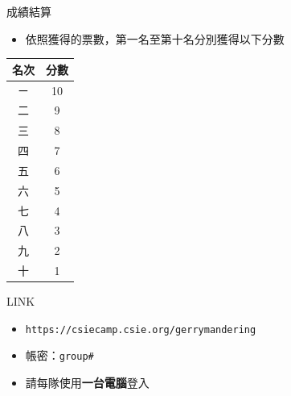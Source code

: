 \begin{frame}{成績結算}
  \vspace{0.4em}
  \begin{itemize}
    \item 依照獲得的票數，第一名至第十名分別獲得以下分數
  \end{itemize}

    \begin{table}[hc]
\centering
\begin{tabular}{|c|c|}
\hline
    \textbf{名次} & \textbf{分數} \\ \hline
    ㄧ & 10 \\ \hline
    二 & 9 \\ \hline
    三 & 8 \\ \hline
    四 & 7 \\ \hline
    五 & 6 \\ \hline
    六 & 5 \\ \hline
    七 & 4 \\ \hline
    八 & 3 \\ \hline
    九 & 2 \\ \hline
    十 & 1 \\ \hline
\end{tabular}
\label{tab:example}
\end{table}
\end{frame}

\begin{frame}{LINK}
  \vspace{0.4em}
  \centering

\begin{itemize}
  \item \texttt{https://csiecamp.csie.org/gerrymandering}
    \item 帳密：\texttt{group\#}
    \item 請每隊使用\textbf{一台電腦}登入
\end{itemize}
  
\end{frame}


